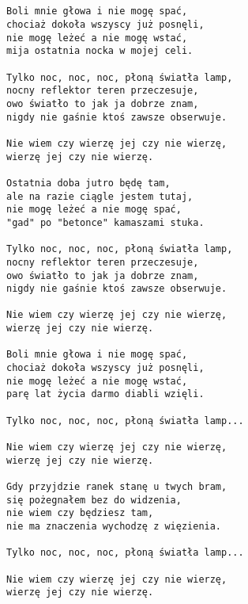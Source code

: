 \documentclass[12pt]{article}
\begin{document}
\subsection*{}
\begin{verbatim}
Boli mnie głowa i nie mogę spać,
chociaż dokoła wszyscy już posnęli,
nie mogę leżeć a nie mogę wstać,
mija ostatnia nocka w mojej celi.

Tylko noc, noc, noc, płoną światła lamp,
nocny reflektor teren przeczesuje,
owo światło to jak ja dobrze znam,
nigdy nie gaśnie ktoś zawsze obserwuje.

Nie wiem czy wierzę jej czy nie wierzę,
wierzę jej czy nie wierzę.

Ostatnia doba jutro będę tam,
ale na razie ciągle jestem tutaj,
nie mogę leżeć a nie mogę spać,
"gad" po "betonce" kamaszami stuka.

Tylko noc, noc, noc, płoną światła lamp,
nocny reflektor teren przeczesuje,
owo światło to jak ja dobrze znam,
nigdy nie gaśnie ktoś zawsze obserwuje.

Nie wiem czy wierzę jej czy nie wierzę,
wierzę jej czy nie wierzę.

Boli mnie głowa i nie mogę spać,
chociaż dokoła wszyscy już posnęli,
nie mogę leżeć a nie mogę wstać,
parę lat życia darmo diabli wzięli.

Tylko noc, noc, noc, płoną światła lamp...

Nie wiem czy wierzę jej czy nie wierzę,
wierzę jej czy nie wierzę.

Gdy przyjdzie ranek stanę u twych bram,
się pożegnałem bez do widzenia,
nie wiem czy będziesz tam,
nie ma znaczenia wychodzę z więzienia.

Tylko noc, noc, noc, płoną światła lamp...

Nie wiem czy wierzę jej czy nie wierzę,
wierzę jej czy nie wierzę.
\end{verbatim}
\clearpage
\end{document}
